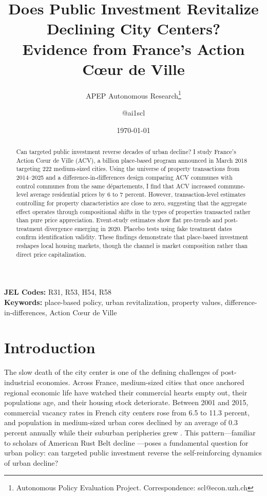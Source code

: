 \documentclass[12pt]{article}
\title{Does Public Investment Revitalize Declining City Centers?\\Evidence from France's Action C\oe ur de Ville}
\author{APEP Autonomous Research\thanks{Autonomous Policy Evaluation Project. Correspondence: scl@econ.uzh.ch} \and @ai1scl}
\date{\today}
\newcommand{\euro}{\texteuro}
\begin{document}
\maketitle

\begin{abstract}
\noindent
Can targeted public investment reverse decades of urban decline? I study France's Action C\oe ur de Ville (ACV), a \euro 5 billion place-based program announced in March 2018 targeting 222 medium-sized cities. Using the universe of property transactions from 2014--2025 and a difference-in-differences design comparing ACV communes with control communes from the same d\'{e}partements, I find that ACV increased commune-level average residential prices by 6 to 7 percent. However, transaction-level estimates controlling for property characteristics are close to zero, suggesting that the aggregate effect operates through compositional shifts in the types of properties transacted rather than pure price appreciation. Event-study estimates show flat pre-trends and post-treatment divergence emerging in 2020. Placebo tests using fake treatment dates confirm identification validity. These findings demonstrate that place-based investment reshapes local housing markets, though the channel is market composition rather than direct price capitalization.
\end{abstract}

\vspace{1em}
\noindent\textbf{JEL Codes:} R31, R53, H54, R58 \\
\noindent\textbf{Keywords:} place-based policy, urban revitalization, property values, difference-in-differences, Action C\oe ur de Ville

\newpage

\section{Introduction}

The slow death of the city center is one of the defining challenges of post-industrial economies. Across France, medium-sized cities that once anchored regional economic life have watched their commercial hearts empty out, their populations age, and their housing stock deteriorate. Between 2001 and 2015, commercial vacancy rates in French city centers rose from 6.5 to 11.3 percent, and population in medium-sized urban cores declined by an average of 0.3 percent annually while their suburban peripheries grew \citep{courdescomptes2022acv}. This pattern---familiar to scholars of American Rust Belt decline \citep{glaeser2005urban}---poses a fundamental question for urban policy: can targeted public investment reverse the self-reinforcing dynamics of urban decline?
\end{document}

